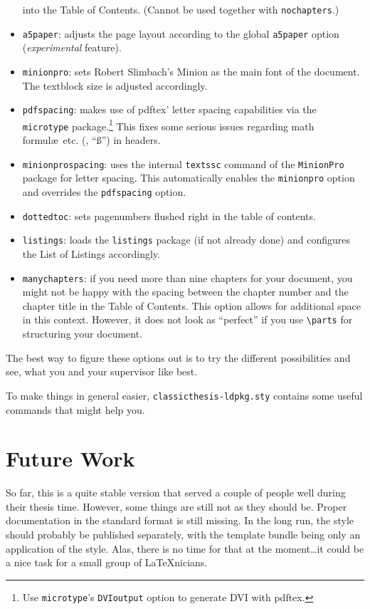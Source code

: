 \begin{itemize}
    into the Table of Contents. (Cannot be used together with
    \texttt{nochapters}.)
    \item\texttt{a5paper}: adjusts the page layout according to the
    global \texttt{a5paper} option (\emph{experimental} feature).
    \item\texttt{minionpro}: sets Robert Slimbach's Minion as the 
    main font of the document. The textblock size is adjusted 
    accordingly. 
    \item\texttt{pdfspacing}: makes use of pdftex' letter spacing
    capabilities via the \texttt{microtype} package.\footnote{Use 
    \texttt{microtype}'s \texttt{DVIoutput} option to generate
    DVI with pdftex.} This fixes some serious issues regarding 
    math formul\ae\ etc. (\eg, ``\ss'') in headers. 
    \item\texttt{minionprospacing}: uses the internal \texttt{textssc}
    command of the \texttt{MinionPro} package for letter spacing. This 
    automatically enables the \texttt{minionpro} option and overrides
    the \texttt{pdfspacing} option.
    \item\texttt{dottedtoc}: sets pagenumbers flushed right in the 
    table of contents.
    \item\texttt{listings}: loads the \texttt{listings} package (if not 
    already done) and configures the List of Listings accordingly.
    \item\texttt{manychapters}: if you need more than nine chapters for 
    your document, you might not be happy with the spacing between the 
    chapter number and the chapter title in the Table of Contents. 
    This option allows for additional space in this context. 
    However, it does not look as ``perfect'' if you use
    \verb|\parts| for structuring your document.
\end{itemize}
The best way to figure these options out is to try the different
possibilities and see, what you and your supervisor like best.

To make things in general easier, \texttt{classicthesis-ldpkg.sty} 
contains some useful commands that might help you.


\section{Future Work}
So far, this is a quite stable version that served a couple of people
well during their thesis time. However, some things are still not as
they should be. Proper documentation in the standard format is still
missing. In the long run, the style should probably be published
separately, with the template bundle being only an application of the
style. Alas, there is no time for that at the moment\dots it could be
a nice task for a small group of \LaTeX nicians.

